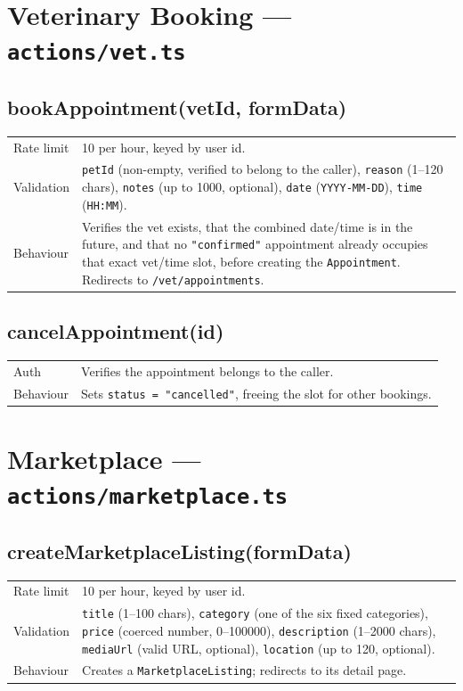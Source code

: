 \documentclass[11pt,a4paper]{article}
\makeatletter
\newcommand{\actiontable}[1]{%
  \begin{tabular}{@{}p{2.6cm}p{10.9cm}@{}}
  #1
  \end{tabular}
}
\makeatother
\begin{document}
\section{Veterinary Booking --- \texttt{actions/vet.ts}}

\subsection{bookAppointment(vetId, formData)}
\actiontable{
Rate limit & 10 per hour, keyed by user id. \\
Validation & \texttt{petId} (non-empty, verified to belong to the caller),
  \texttt{reason} (1--120 chars), \texttt{notes} (up to 1000, optional), \texttt{date}
  (\texttt{YYYY-MM-DD}), \texttt{time} (\texttt{HH:MM}). \\
Behaviour & Verifies the vet exists, that the combined date/time is in the future, and
  that no \texttt{"confirmed"} appointment already occupies that exact vet/time slot,
  before creating the \texttt{Appointment}. Redirects to
  \texttt{/vet/appointments}. \\
}

\subsection{cancelAppointment(id)}
\actiontable{
Auth & Verifies the appointment belongs to the caller. \\
Behaviour & Sets \texttt{status = "cancelled"}, freeing the slot for other bookings. \\
}

\section{Marketplace --- \texttt{actions/marketplace.ts}}

\subsection{createMarketplaceListing(formData)}
\actiontable{
Rate limit & 10 per hour, keyed by user id. \\
Validation & \texttt{title} (1--100 chars), \texttt{category} (one of the six fixed
  categories), \texttt{price} (coerced number, 0--100000), \texttt{description}
  (1--2000 chars), \texttt{mediaUrl} (valid URL, optional), \texttt{location} (up to
  120, optional). \\
Behaviour & Creates a \texttt{MarketplaceListing}; redirects to its detail page. \\
}
\end{document}
